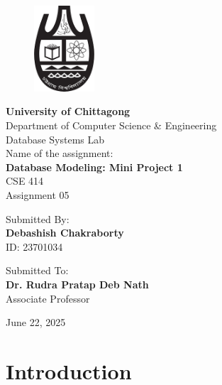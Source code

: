 \documentclass[12pt,a4paper]{article}
\begin{document}
\begin{titlepage}
    \begin{figure}[htbp]
    \centering
    \includegraphics[width=0.2\textwidth]{cu.png}
    \end{figure}
    \centering
    \vspace*{0.5cm}
    {\Huge\bfseries University of Chittagong}\\[0.5cm]
    {\Large Department of Computer Science \& Engineering}\\[0.5cm]
    {\large Database Systems Lab}\\[2cm]
    
    {\large Name of the assignment:}\\[0.3cm]
    {\LARGE\bfseries Database Modeling: Mini Project 1\\[0.5cm]}
    {\large CSE 414}\\[0.5cm]
    {\large Assignment 05}\\[3cm]
    
    \begin{minipage}[t]{0.4\textwidth}
    \raggedleft
    Submitted By:\\
    \large \textbf{Debashish Chakraborty}\\
    \large ID: 23701034
    \end{minipage}
    \hspace{0.05\textwidth}
    \vrule width 1pt
    \hspace{0.05\textwidth}
    \begin{minipage}[t]{0.4\textwidth}
    Submitted To:\\
    \large \textbf{Dr. Rudra Pratap Deb Nath}\\
    \large Associate Professor
    \end{minipage}
    
    \vfill
    {\large June 22, 2025}
\end{titlepage}

\newpage
\tableofcontents
\newpage 

\section{Introduction}
\end{document}
